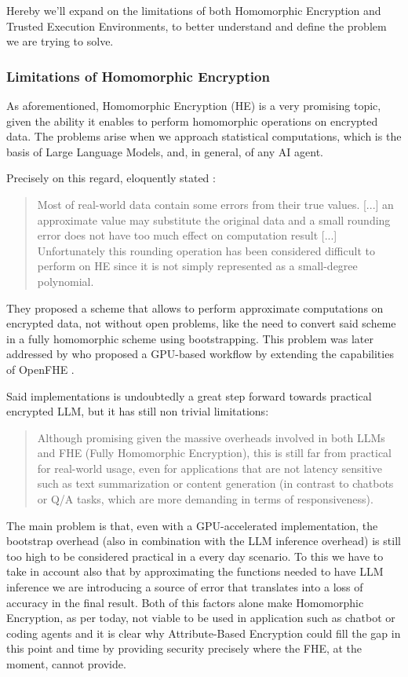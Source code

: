 Hereby we'll expand on the limitations of both Homomorphic Encryption and Trusted Execution Environments, to better understand and define the problem we are trying to solve.
\subsubsection{Limitations of Homomorphic Encryption}
As aforementioned, Homomorphic Encryption (HE) is a very promising topic, given the ability it enables to perform homomorphic operations on encrypted data. The problems arise when we approach statistical computations, which is the basis of Large Language Models, and, in general, of any AI agent.

Precisely on this regard, \citeauthor{cheon2017homomorphic} eloquently stated \cite{cheon2017homomorphic}:
\begin{quote}
    Most of real-world data contain some errors from their true values. [...] an approximate value may substitute the original data and a small rounding
error does not have too much effect on computation result [...]
    Unfortunately this rounding operation has been considered difficult to perform on HE
since it is not simply represented as a small-degree polynomial.
\end{quote}
They proposed a scheme that allows to perform approximate computations on encrypted data, not without open problems, like the need to convert said scheme in a fully homomorphic scheme using bootstrapping. This problem was later addressed by \citeauthor{de2025encryptedllm} who proposed a GPU-based workflow by extending the capabilities of OpenFHE \cite{al2022openfhe}.

Said implementations is undoubtedly a great step forward towards practical encrypted LLM, but it has still non trivial limitations:
\begin{quote}
    Although promising given the massive overheads involved in both LLMs
    and FHE (Fully Homomorphic Encryption), this is still far from practical for real-world usage,
    even for applications that are not latency sensitive such
    as text summarization or content generation (in contrast to
    chatbots or Q/A tasks, which are more demanding in terms
    of responsiveness).
\end{quote}
The main problem is that, even with a GPU-accelerated implementation, the bootstrap overhead (also in combination with the LLM inference overhead) is still too high to be considered practical in a every day scenario.
To this we have to take in account also that by approximating the functions needed to have LLM inference we are introducing a source of error that translates into a loss of accuracy in the final result.
Both of this factors alone make Homomorphic Encryption, as per today, not viable to be used in application such as chatbot or coding agents and it is clear why Attribute-Based Encryption could fill the gap in this point and time by providing security precisely where the FHE, at the moment, cannot provide.
